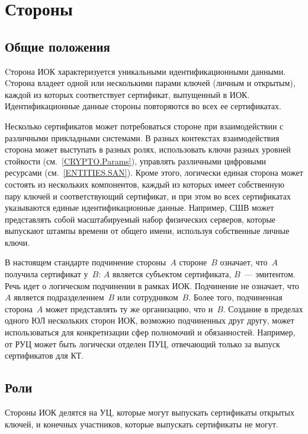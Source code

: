 \chapter{Стороны}\label{ENTITIES}

\section{Общие положения}\label{ENTITIES.Common}

Cторона ИОК характеризуется уникальными идентификационными данными.
%
Cторона владеет одной или несколькими парами ключей (личным и открытым),
каждой из которых соответствует сертификат, выпущенный в ИОК. 
%
Идентификационные данные стороны повторяются во всех ее сертификатах.

Несколько сертификатов может потребоваться стороне при взаимодействии 
с различными прикладными системами. В разных контекстах взаимодействия
сторона может выступать в разных ролях, 
использовать ключи разных уровней стойкости (см.~\ref{CRYPTO.Params}), 
управлять различными цифровыми ресурсами (см.~\ref{ENTITIES.SAN}). 
%
Кроме этого, логически единая сторона может состоять из нескольких 
компонентов, каждый из которых имеет собственную пару ключей 
и соответствующий сертификат, и при этом во всех сертификатах указываются 
единые идентификационные данные.
%
Например, СШВ может представлять собой масштабируемый набор физических серверов, 
которые выпускают штампы времени от общего имени, используя собственные личные ключи.

В настоящем стандарте
подчинение стороны~$A$ стороне~$B$ означает, что~$A$ получила сертификат 
у~$B$: $A$ является субъектом сертификата, $B$~--- эмитентом.
%
Речь идет о логическом подчинении в рамках ИОК.
Подчинение не означает, что~$A$ является подразделением~$B$ или сотрудником~$B$. 
Более того, подчиненная сторона~$A$ может представлять ту же организацию, 
что и~$B$.
%
Создание в пределах одного ЮЛ нескольких сторон ИОК, 
возможно подчиненных друг другу, может использоваться для конкретизации 
сфер полномочий и обязанностей.
%
Например, от РУЦ может быть логически отделен ПУЦ, 
отвечающий только за выпуск сертификатов для КТ.

\section{Роли}

Стороны ИОК делятся на УЦ, которые могут выпускать сертификаты открытых ключей, 
и конечных участников, которые выпускать сертификаты не могут.

